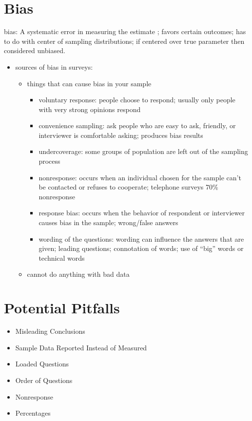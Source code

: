 \documentclass[]{book}
\providecommand{\tightlist}{%
  \setlength{\itemsep}{0pt}\setlength{\parskip}{0pt}}
\begin{document}
\hypertarget{bias}{%
\section{Bias}\label{bias}}

bias: A systematic error in measuring the estimate ; favors certain outcomes; has to do with center of sampling distributions; if centered over true parameter then considered unbiased.

\begin{itemize}
\tightlist
\item
  sources of bias in surveys:

  \begin{itemize}
  \tightlist
  \item
    things that can cause bias in your sample

    \begin{itemize}
    \tightlist
    \item
      voluntary response: people choose to respond; usually only people with very strong opinions respond
    \item
      convenience sampling: ask people who are easy to ask, friendly, or interviewer is comfortable asking; produces bias results
    \item
      undercoverage: some groups of population are left out of the sampling process
    \item
      nonresponse: occurs when an individual chosen for the sample can't be contacted or refuses to cooperate; telephone surveys 70\% nonresponse
    \item
      response bias: occurs when the behavior of respondent or interviewer causes bias in the sample; wrong/false answers
    \item
      wording of the questions: wording can influence the answers that are given; leading questions; connotation of words; use of ``big'' words or technical words
    \end{itemize}
  \item
    cannot do anything with bad data
  \end{itemize}
\end{itemize}

\hypertarget{potential-pitfalls}{%
\section{Potential Pitfalls}\label{potential-pitfalls}}

\begin{itemize}
\tightlist
\item
  Misleading Conclusions
\item
  Sample Data Reported Instead of Measured
\item
  Loaded Questions
\item
  Order of Questions
\item
  Nonresponse
\item
  Percentages
\end{itemize}
\end{document}
